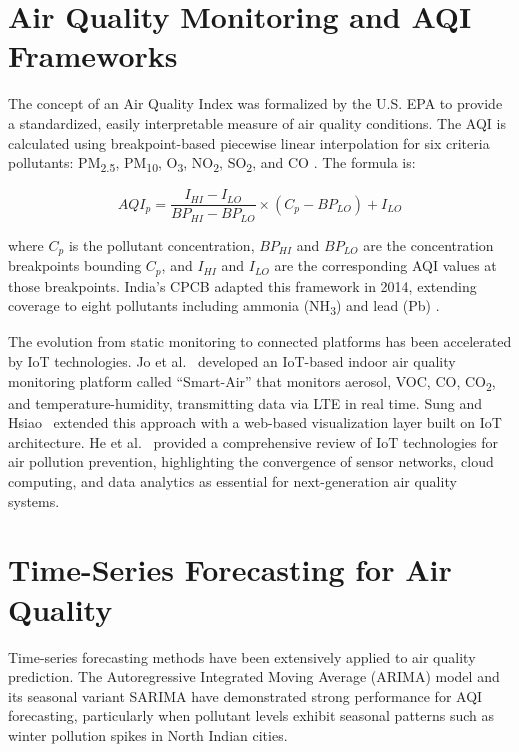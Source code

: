 \documentclass[12pt,a4paper]{report}
\begin{document}
\section{Air Quality Monitoring and AQI Frameworks}

The concept of an Air Quality Index was formalized by the U.S. EPA to provide a standardized, easily interpretable measure of air quality conditions. The AQI is calculated using breakpoint-based piecewise linear interpolation for six criteria pollutants: PM\textsubscript{2.5}, PM\textsubscript{10}, O\textsubscript{3}, NO\textsubscript{2}, SO\textsubscript{2}, and CO \cite{EPA2024aqitechnical}. The formula is:

\begin{equation}
  AQI_p = \frac{I_{HI} - I_{LO}}{BP_{HI} - BP_{LO}} \times (C_p - BP_{LO}) + I_{LO}
  \label{eq:aqi}
\end{equation}

where $C_p$ is the pollutant concentration, $BP_{HI}$ and $BP_{LO}$ are the concentration breakpoints bounding $C_p$, and $I_{HI}$ and $I_{LO}$ are the corresponding AQI values at those breakpoints. India's CPCB adapted this framework in 2014, extending coverage to eight pollutants including ammonia (NH\textsubscript{3}) and lead (Pb) \cite{CPCB2014naqi}.

The evolution from static monitoring to connected platforms has been accelerated by IoT technologies. Jo et al.~\cite{Jo2020iot} developed an IoT-based indoor air quality monitoring platform called ``Smart-Air'' that monitors aerosol, VOC, CO, CO\textsubscript{2}, and temperature-humidity, transmitting data via LTE in real time. Sung and Hsiao~\cite{Sung2021iot} extended this approach with a web-based visualization layer built on IoT architecture. He et al.~\cite{He2021iot} provided a comprehensive review of IoT technologies for air pollution prevention, highlighting the convergence of sensor networks, cloud computing, and data analytics as essential for next-generation air quality systems.

\section{Time-Series Forecasting for Air Quality}

Time-series forecasting methods have been extensively applied to air quality prediction. The Autoregressive Integrated Moving Average (ARIMA) model and its seasonal variant SARIMA have demonstrated strong performance for AQI forecasting, particularly when pollutant levels exhibit seasonal patterns such as winter pollution spikes in North Indian cities.
\end{document}

